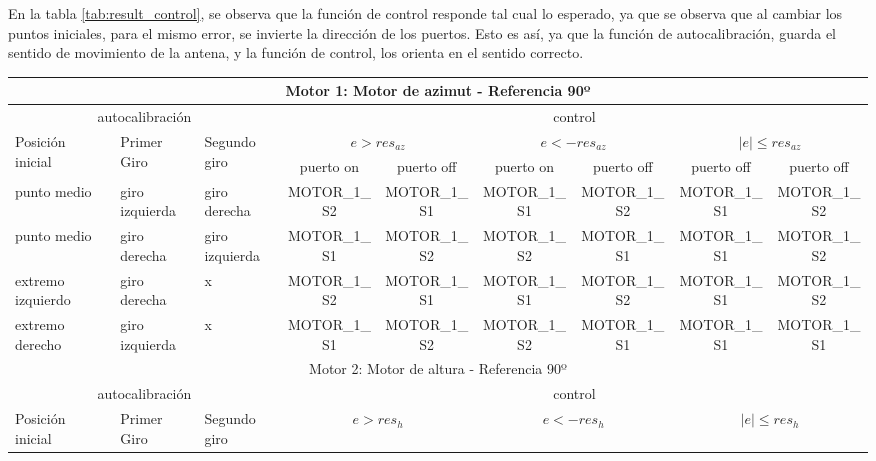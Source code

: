 En la tabla \ref{tab:result_control}, se observa que la función de control responde tal cual lo esperado, ya que se observa que al cambiar los puntos iniciales, para el mismo error, se invierte la dirección de los puertos. Esto es así, ya que la función de autocalibración, guarda el sentido de movimiento de la antena, y la función de control, los orienta en el sentido correcto.    


\begin{table}[ht]
\resizebox{\linewidth}{!}
{
  \begin{threeparttable}		
	\begin{tabular}{|p{1.5cm}|p{1.5cm}|p{1.5cm}|c|c|c|c|c|c|}
		\hline 
		\multicolumn{9}{|c|}{Motor 1: Motor de azimut - Referencia 90º } \\
		\hline 
		\multicolumn{3}{|c|}{autocalibración} & \multicolumn{6}{c|}{control } \\
		\hline 
		\multirow{2}{1.4cm}{Posición inicial} &\multirow{2}{1.4cm}{ Primer Giro} & \multirow{2}{1.4cm}{Segundo giro} &\multicolumn{2}{c|}{$e>res_{az}$} &\multicolumn{2}{c|}{$e<-res_{az}$} &\multicolumn{2}{c|}{$|e|\leq res_{az}$} \\ \cline{4-9}
		
		 & &  & puerto on & puerto off &puerto on & puerto off&puerto off & puerto off\\ 
		\hline 
		punto medio & giro izquierda & giro derecha & MOTOR\_1\_S2 & MOTOR\_1\_S1  & MOTOR\_1\_S1& MOTOR\_1\_S2& MOTOR\_1\_S1 & MOTOR\_1\_S2 \\ 
		\hline 
		punto medio & giro derecha & giro izquierda &MOTOR\_1\_S1  &MOTOR\_1\_S2
		& MOTOR\_1\_S2&  MOTOR\_1\_S1 &MOTOR\_1\_S1 & MOTOR\_1\_S2 	\\
		\hline 
		extremo izquierdo & giro derecha & x &MOTOR\_1\_S2  & MOTOR\_1\_S1  & MOTOR\_1\_S1& MOTOR\_1\_S2 &MOTOR\_1\_S1 & MOTOR\_1\_S2 \\ 
		\hline 
		extremo derecho & giro izquierda & x & MOTOR\_1\_S1&MOTOR\_1\_S2  & MOTOR\_1\_S2 &MOTOR\_1\_S1 &MOTOR\_1\_S1 &MOTOR\_1\_S1  \\ 
		\hline 
		\hline 
		\multicolumn{9}{|c|}{Motor 2: Motor de altura - Referencia 90º } \\
		\hline 
		\multicolumn{3}{|c|}{autocalibración} & \multicolumn{6}{c|}{control } \\
		\hline 
		\multirow{2}{1.4cm}{Posición inicial} &\multirow{2}{1.4cm}{ Primer Giro} & \multirow{2}{1.4cm}{Segundo giro} &\multicolumn{2}{c|}{$e>res_h$} & \multicolumn{2}{c|}{$e<-res_h$\tnote{1}}  &\multicolumn{2}{c|}{$|e|\leq res_h$} \\ \cline{4-9}
		

\end{tabular}
\end{threeparttable}}
\end{table}
